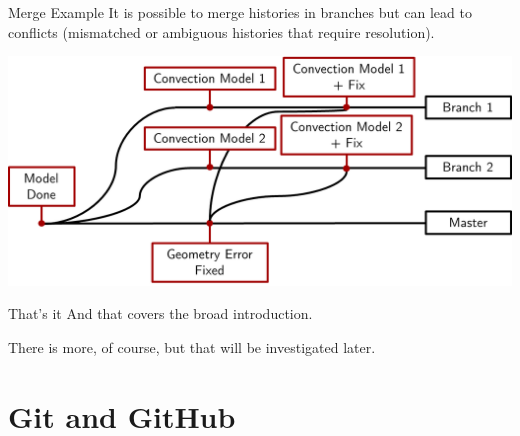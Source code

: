 \documentclass[10pt,t,xcolor=table]{UWMadBeamer}
\begin{document}
    \begin{frame}[c]{Merge Example}
        It is possible to {merge} histories in branches but can lead to { conflicts} (mismatched or ambiguous histories that require resolution).
        
        {
            \centering
            \includegraphics[scale=0.50]{MergeExample}
        }
    \end{frame}

    \begin{frame}{That's it}
        And that covers the broad introduction.
        
        There is more, of course, but that will be investigated later.
    \end{frame}



\section{Git and GitHub}
\end{document}
